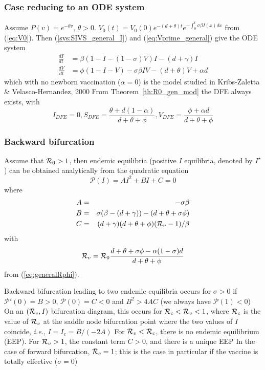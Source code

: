 \documentclass[aspectratio=169]{beamer}\usepackage[]{graphicx}\usepackage[]{xcolor}
\begin{document}
\begin{frame}\frametitle{Case reducing to an ODE system}
Assume $P(v)=e^{-\theta v}$, $\theta>0$.
$V_0(t)=V_0(0)e^{-(d+\theta)t}e^{-\int_0^t\sigma\beta I(x)dx}$ from
(\ref{eq:V0}). Then (\ref{sys:SIVS_general_I}) and
(\ref{eq:Vprime_general}) give the ODE system
\begin{subequations}\label{ODEmodel}
\begin{align}
\frac{dI}{dt}&= \beta(1-I-(1-\sigma)V)I-(d+\gamma)I
\label{ODEmodelI}\\
\frac{dV}{dt}&= \phi(1-I-V)-\sigma\beta IV -(d+\theta)V+\alpha d
\label{ODEmodelV}
\end{align}
\end{subequations}
which with no newborn vaccination ($\alpha=0$) is the model studied in Kribs-Zaletta \& Velasco-Hernandez, 2000
\vfill
From Theorem~\ref{th:R0_gen_mod} the DFE always exists, with
\[
I_{DFE}=0,
S_{DFE}=\frac{\theta+d(1-\alpha)}{d+\theta+\phi},
V_{DFE}=\frac{\phi+\alpha d}{d+\theta+\phi}
\]
\end{frame}



\begin{frame}\frametitle{Backward bifurcation}
Assume that $\mathcal{R}_0>1$, then endemic equilibria (positive $I$
equilibria, denoted
by $I^\star$) can be obtained analytically from the quadratic equation
\[
\mathcal{P} (I)=AI^2+BI+C=0
\]
where
\begin{eqnarray*}
A&=& -\sigma\beta \\
B&=& \sigma(\beta-(d+\gamma))-(d+\theta+\sigma\phi)\\
C&=& (d+\gamma)(d+\theta+\phi)(\mathcal{R}_v-1)/\beta
\end{eqnarray*}
with
\[
\mathcal{R}_v=\mathcal{R}_0\frac{d+\theta+\sigma\phi-\alpha(1-\sigma)d}{d+\theta+\phi}
\]
from  (\ref{eq:generalRphi}).
\end{frame}

\begin{frame}
Backward bifurcation leading to two endemic
equilibria occurs for $\sigma>0$ if $ \mathcal{P}'(0)=B>0$,
$\mathcal{P}(0)=C<0$ and $B^2>4AC$ (we always have
$\mathcal{P}(1)<0$)
\vfill
\bbullet
On an $(\mathcal{R}_v,I)$ bifurcation diagram, this occurs for
$\mathcal{R}_c<\mathcal{R}_v<1$, where $\mathcal{R}_c$ is the value of $\mathcal{R}_v$ at
the saddle node bifurcation point where the two values of $I$ coincide,
\emph{i.e.}, $I=I_c=B/(-2A)$
\vfill
\bbullet
For $\mathcal{R}_v<\mathcal{R}_c$, there is no endemic equilibrium (EEP).
For $\mathcal{R}_v>1$, the constant term $C>0$, and there is a unique EEP
\vfill
\bbullet
In the case of forward bifurcation, $\mathcal{R}_c=1$; this is the case in
particular if the vaccine is totally effective ($\sigma=0$)
\end{frame}
\end{document}
